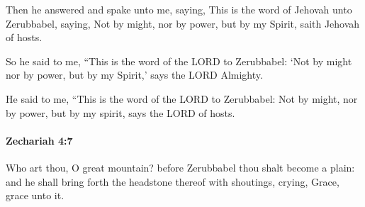 			\begin{versebox}
					\item[BHS] 
					\item[LXX] 
					\item[ASV] Then he answered and spake unto me, saying, This is the word of Jehovah unto Zerubbabel, saying, Not by might, nor by power, but by my Spirit, saith Jehovah of hosts.
					\item[NIV] So he said to me, “This is the word of the LORD to Zerubbabel: ‘Not by might nor by power, but by my Spirit,’ says the LORD Almighty.
					\item[NRSV] He said to me, “This is the word of the LORD to Zerubbabel: Not by might, nor by power, but by my spirit, says the LORD of hosts.
			\end{versebox}

		\paragraph{Zechariah 4:7} %
			\label{ZECHARIAH-4-7}

			Who art thou, O great mountain? before Zerubbabel thou shalt become a plain: and he shall bring forth the headstone thereof with shoutings, crying, Grace, grace unto it.


